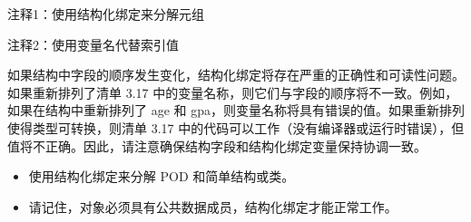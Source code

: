 {\footnotesize
注释1：使用结构化绑定来分解元组

注释2：使用变量名代替索引值
}

如果结构中字段的顺序发生变化，结构化绑定将存在严重的正确性和可读性问题。如果重新排列了清单 3.17 中的变量名称，则它们与字段的顺序将不一致。例如，如果在结构中重新排列了 age 和 gpa，则变量名称将具有错误的值。如果重新排列使得类型可转换，则清单 3.17 中的代码可以工作（没有编译器或运行时错误），但值将不正确。因此，请注意确保结构字段和结构化绑定变量保持协调一致。


\begin{itemize}
\item
使用结构化绑定来分解 POD 和简单结构或类。

\item
请记住，对象必须具有公共数据成员，结构化绑定才能正常工作。
\end{itemize}
